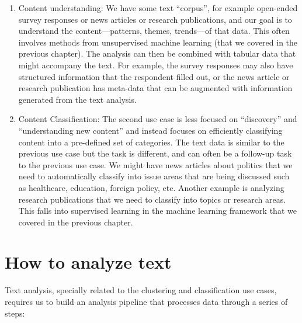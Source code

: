 \documentclass[]{krantz}
\begin{document}
\begin{enumerate}
\def\labelenumi{\arabic{enumi}.}
\item
  Content understanding: We have some text ``corpus'', for example
  open-ended survey responses or news articles or research publications,
  and our goal is to understand the content---patterns, themes,
  trends---of that data. This often involves methods from unsupervised
  machine learning (that we covered in the previous chapter). The
  analysis can then be combined with tabular data that might accompany
  the text. For example, the survey responses may also have structured
  information that the respondent filled out, or the news article or
  research publication has meta-data that can be augmented with
  information generated from the text analysis.
\item
  Content Classification: The second use case is less focused on
  ``discovery'' and ``understanding new content'' and instead focuses on
  efficiently classifying content into a pre-defined set of categories.
  The text data is similar to the previous use case but the task is
  different, and can often be a follow-up task to the previous use case.
  We might have news articles about politics that we need to
  automatically classify into issue areas that are being discussed such
  as healthcare, education, foreign policy, etc. Another example is
  analyzing research publications that we need to classify into topics
  or research areas. This falls into supervised learning in the machine
  learning framework that we covered in the previous chapter.
\end{enumerate}

\section{How to analyze text}\label{how-to-analyze-text}

Text analysis, specially related to the clustering and classification
use cases, requires us to build an analysis pipeline that processes data
through a series of steps:
\end{document}
